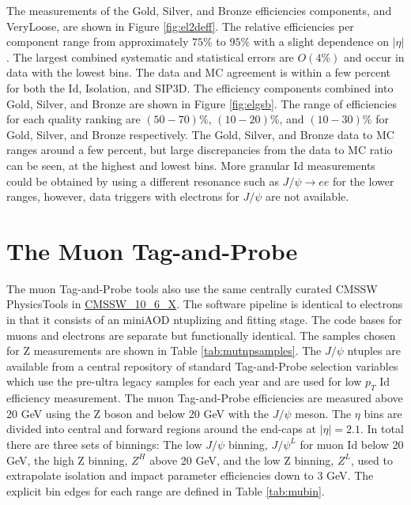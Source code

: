 The measurements of the Gold, Silver, and Bronze efficiencies components, and VeryLoose, are shown in Figure \ref{fig:el2deff}. The relative efficiencies per component range from approximately $75\%$ to $95\%$ with a slight dependence on $|\eta|$. The largest combined systematic and statistical errors are $O(4\%)$ and occur in data with the lowest \pt bins. The data and MC agreement is within a few percent for both the Id, Isolation, and SIP3D. The efficiency components combined into Gold, Silver, and Bronze are shown in Figure \ref{fig:elgsb}. The range of efficiencies for each quality ranking are $(50-70)\%$, $(10-20)\%$, and $(10-30)\%$ for Gold, Silver, and Bronze respectively. The Gold, Silver, and Bronze data to MC ranges around a few percent, but large discrepancies from the data to MC ratio can be seen, at the highest and lowest \pt bins. More granular Id measurements could be obtained by using a different resonance such as $J/\psi \rightarrow ee$ for the lower \pt ranges, however, data triggers with electrons for $J/\psi$ are not available.




\FloatBarrier
\section{The Muon Tag-and-Probe}
The muon Tag-and-Probe tools also use the same centrally curated CMSSW PhysicsTools in \url{CMSSW_10_6_X}. The software pipeline is identical to electrons in that it consists of an miniAOD \cite{Petrucciani:2015gjw} ntuplizing \cite{MuTnPTwiki} and fitting \cite{MuTnPAnaTwiki} stage. The code bases for muons and electrons are separate but functionally identical. The samples chosen for Z measurements are shown in Table \ref{tab:mutnpsamples}. The $J/\psi$ ntuples are available from a central repository of standard Tag-and-Probe selection variables which use the pre-ultra legacy samples for each year \cite{MuTnPCentralSamps} and are used for low $p_T$ Id efficiency measurement. The muon Tag-and-Probe efficiencies are measured above 20 GeV using the Z boson and below 20 GeV with the $J/\psi$ meson. The $\eta$ bins are divided into central and forward regions around the end-caps at $|\eta| = 2.1$. In total there are three sets of binnings: The low \pt $J/\psi$ binning, $J/\psi^{L}$ for muon Id below 20 GeV, the high \pt Z binning, $Z^{H}$ above 20 GeV, and the low \pt Z binning, $Z^{L}$, used to extrapolate isolation and impact parameter efficiencies down to 3 GeV.  The explicit bin edges for each range are defined in Table \ref{tab:mubin}.


